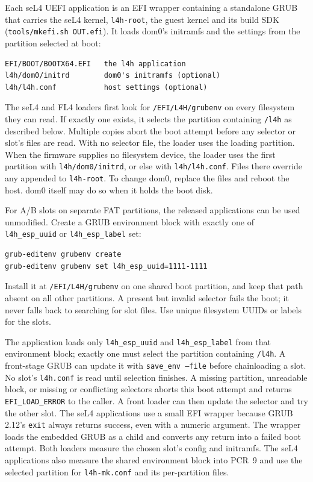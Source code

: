 \documentclass[11pt,a4paper]{report}
\newcommand{\cmd}[1]{\texttt{#1}}
\newcommand{\file}[1]{\texttt{#1}}
\begin{document}
Each seL4 UEFI application is an EFI wrapper
containing a standalone GRUB that carries the seL4 kernel,
\texttt{l4h-root}, the guest kernel and its build SDK
(\cmd{tools/mkefi.sh OUT.efi}). It loads dom0's initramfs
and the settings from the partition selected at boot:
\begin{lstlisting}
EFI/BOOT/BOOTX64.EFI   the l4h application
l4h/dom0/initrd        dom0's initramfs (optional)
l4h/l4h.conf           host settings (optional)
\end{lstlisting}
The seL4 and FL4 loaders first look for
\file{/EFI/L4H/grubenv} on every filesystem they can read. If exactly one exists, it selects
the partition containing \file{/l4h} as described below. Multiple copies
abort the boot attempt before any selector or slot's files are read.
With no selector file, the loader uses the loading partition.
When the firmware supplies no filesystem device, the loader uses
the first partition with \file{l4h/dom0/initrd}, or else with
\file{l4h/l4h.conf}. Files there override any appended to
\texttt{l4h-root}. To change dom0, replace the files and
reboot the host. dom0 itself may do so when it holds the boot disk.

For A/B slots on separate FAT partitions, the released applications can
be used unmodified. Create a GRUB environment block with exactly one of
\texttt{l4h\_esp\_uuid} or \texttt{l4h\_esp\_label} set:
\begin{lstlisting}
grub-editenv grubenv create
grub-editenv grubenv set l4h_esp_uuid=1111-1111
\end{lstlisting}
Install it at \file{/EFI/L4H/grubenv} on one shared boot partition, and
keep that path absent on all other partitions. A present but invalid
selector fails the boot; it never falls back to searching for slot files.
Use unique filesystem UUIDs or labels for the slots.

The application loads only \texttt{l4h\_esp\_uuid} and
\texttt{l4h\_esp\_label} from that environment block; exactly one must
select the partition containing \file{/l4h}. A front-stage GRUB can update
it with \texttt{save\_env --file} before chainloading a slot. No slot's
\file{l4h.conf} is read until selection finishes. A missing partition,
unreadable block, or missing or conflicting selectors aborts this boot
attempt and returns \texttt{EFI\_LOAD\_ERROR} to the caller. A front
loader can then update the selector and try the other slot. The seL4
applications use a small EFI wrapper because GRUB 2.12's \texttt{exit} always returns
success, even with a numeric argument. The wrapper loads the embedded
GRUB as a child and converts any return into a failed boot attempt.
Both loaders measure the chosen slot's config and initramfs. The seL4
applications also measure the shared environment block into PCR~9 and use
the selected partition for \file{l4h-mk.conf} and its per-partition files.
\end{document}

